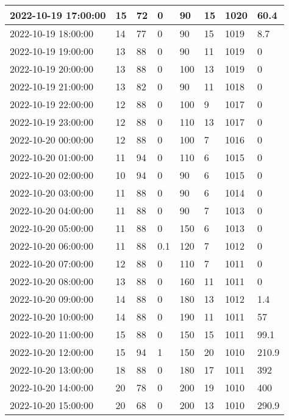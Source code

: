 \begin{longtable}{|l|l|l|l|l|l|l|l|}
        2022-10-19 17:00:00 & 15 & 72 & 0 & 90 & 15 & 1020 & 60.4 \\ \hline
        2022-10-19 18:00:00 & 14 & 77 & 0 & 90 & 15 & 1019 & 8.7 \\ \hline
        2022-10-19 19:00:00 & 13 & 88 & 0 & 90 & 11 & 1019 & 0 \\ \hline
        2022-10-19 20:00:00 & 13 & 88 & 0 & 100 & 13 & 1019 & 0 \\ \hline
        2022-10-19 21:00:00 & 13 & 82 & 0 & 90 & 11 & 1018 & 0 \\ \hline
        2022-10-19 22:00:00 & 12 & 88 & 0 & 100 & 9 & 1017 & 0 \\ \hline
        2022-10-19 23:00:00 & 12 & 88 & 0 & 110 & 13 & 1017 & 0 \\ \hline
        2022-10-20 00:00:00 & 12 & 88 & 0 & 100 & 7 & 1016 & 0 \\ \hline
        2022-10-20 01:00:00 & 11 & 94 & 0 & 110 & 6 & 1015 & 0 \\ \hline
        2022-10-20 02:00:00 & 10 & 94 & 0 & 90 & 6 & 1015 & 0 \\ \hline
        2022-10-20 03:00:00 & 11 & 88 & 0 & 90 & 6 & 1014 & 0 \\ \hline
        2022-10-20 04:00:00 & 11 & 88 & 0 & 90 & 7 & 1013 & 0 \\ \hline
        2022-10-20 05:00:00 & 11 & 88 & 0 & 150 & 6 & 1013 & 0 \\ \hline
        2022-10-20 06:00:00 & 11 & 88 & 0.1 & 120 & 7 & 1012 & 0 \\ \hline
        2022-10-20 07:00:00 & 12 & 88 & 0 & 110 & 7 & 1011 & 0 \\ \hline
        2022-10-20 08:00:00 & 13 & 88 & 0 & 160 & 11 & 1011 & 0 \\ \hline
        2022-10-20 09:00:00 & 14 & 88 & 0 & 180 & 13 & 1012 & 1.4 \\ \hline
        2022-10-20 10:00:00 & 14 & 88 & 0 & 190 & 11 & 1011 & 57 \\ \hline
        2022-10-20 11:00:00 & 15 & 88 & 0 & 150 & 15 & 1011 & 99.1 \\ \hline
        2022-10-20 12:00:00 & 15 & 94 & 1 & 150 & 20 & 1010 & 210.9 \\ \hline
        2022-10-20 13:00:00 & 18 & 88 & 0 & 180 & 17 & 1011 & 392 \\ \hline
        2022-10-20 14:00:00 & 20 & 78 & 0 & 200 & 19 & 1010 & 400 \\ \hline
        2022-10-20 15:00:00 & 20 & 68 & 0 & 200 & 13 & 1010 & 290.9 \\ \hline

\end{longtable}
